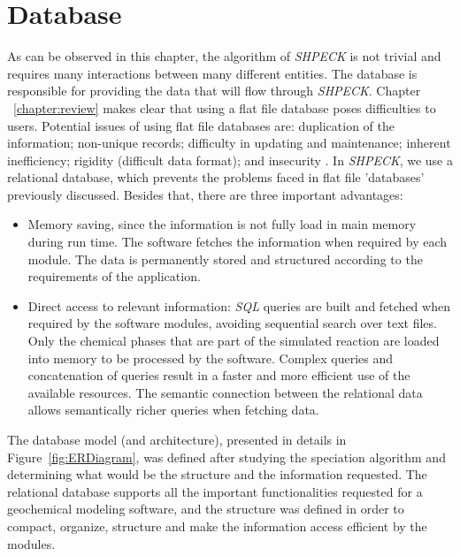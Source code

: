 \section{Database}
As can be observed in this chapter, the algorithm of \emph{SHPECK} is not trivial and requires many interactions between many different entities. The database is responsible for providing the data that will flow through \emph{SHPECK}. Chapter ~\ref{chapter:review} makes clear that using a flat file database poses difficulties to users. Potential issues of using flat file databases are: duplication of the information; non-unique records; difficulty in updating and maintenance; inherent inefficiency; rigidity (difficult data format); and insecurity \cite{dauerer2000system}. 
In \emph{SHPECK}, we use a relational database, which prevents the problems faced in flat file 'databases' previously discussed. Besides that, there are three important advantages:
\begin{itemize}
\item Memory saving, since the information is not fully load in main memory during run time. The software fetches the information when required by each module. The data is permanently stored and  structured according to the requirements of the application.
\item Direct access to relevant information: \emph{SQL} queries are built and fetched when required by the software modules, avoiding sequential search over text files.  Only the chemical phases that are part of the simulated reaction are loaded into memory to be processed by the software. Complex queries and concatenation of queries result in a faster and more efficient use of the available resources. The semantic connection between the relational data allows semantically richer queries when fetching data.
\end{itemize}

The database model (and architecture), presented in details in Figure~\ref{fig:ERDiagram}, was defined after studying the speciation algorithm and determining what would be the structure and the information requested.  The relational database supports all the important functionalities requested for a geochemical modeling software, and the structure was defined in order to compact, organize, structure and make the information access efficient by the modules. 

